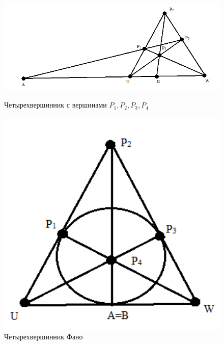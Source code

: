 \begin{figure}[H]
\begin{changemargin}{-1.5cm}{-1cm}
  \begin{center}
    \begin{minipage}[h]{0.68\linewidth}
        \includegraphics[width=1\textwidth]{authors/Stepanuk-1-fig-1.png}
        \caption{Четырехвершинник с вершинами $P_1, P_2, P_3, P_4$}
        \label{fig:Stepanuk-1-fig-1}
    \end{minipage}
\hfill
    \begin{minipage}[h]{0.28\linewidth}
        \includegraphics[width=1\textwidth]{authors/Stepanuk-1-fig-2.png}
        \caption{Четырехвершинник Фано}
        \label{fig:Stepanuk-1-fig-2}
    \end{minipage}


  \end{center}
\end{changemargin}

\end{figure}
